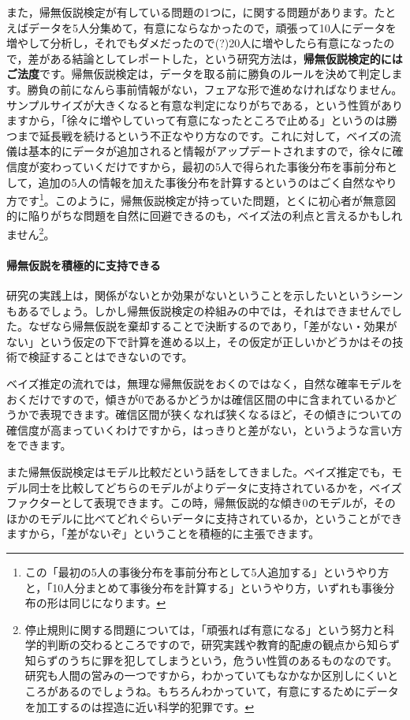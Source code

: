 \documentclass{ltjbook}
\begin{document}
また，帰無仮説検定が有している問題の1つに，に関する問題があります。たとえばデータを5人分集めて，有意にならなかったので，頑張って10人にデータを増やして分析し，それでもダメだったので(?)20人に増やしたら有意になったので，差がある結論としてレポートした，という研究方法は，\textbf{帰無仮説検定的にはご法度}です。帰無仮説検定は，データを取る前に勝負のルールを決めて判定します。勝負の前になんら事前情報がない，フェアな形で進めなければなりません。サンプルサイズが大きくなると有意な判定になりがちである，という性質がありますから，「徐々に増やしていって有意になったところで止める」というのは勝つまで延長戦を続けるという不正なやり方なのです。これに対して，ベイズの流儀は基本的にデータが追加されると情報がアップデートされますので，徐々に確信度が変わっていくだけですから，最初の5人で得られた事後分布を事前分布として，追加の5人の情報を加えた事後分布を計算するというのはごく自然なやり方です\footnote{この「最初の5人の事後分布を事前分布として5人追加する」というやり方と，「10人分まとめて事後分布を計算する」というやり方，いずれも事後分布の形は同じになります。}。このように，帰無仮説検定が持っていた問題，とくに初心者が無意図的に陥りがちな問題を自然に回避できるのも，ベイズ法の利点と言えるかもしれません\footnote{停止規則に関する問題については，「頑張れば有意になる」という努力と科学的判断の交わるところですので，研究実践や教育的配慮の観点から知らず知らずのうちに罪を犯してしまうという，危うい性質のあるものなのです。研究も人間の営みの一つですから，わかっていてもなかなか区別しにくいところがあるのでしょうね。もちろんわかっていて，有意にするためにデータを加工するのは捏造に近い科学的犯罪です。}。

\paragraph{帰無仮説を積極的に支持できる}
研究の実践上は，関係がないとか効果がないということを示したいというシーンもあるでしょう。しかし帰無仮説検定の枠組みの中では，それはできませんでした。なぜなら帰無仮説を棄却することで決断するのであり，「差がない・効果がない」という仮定の下で計算を進める以上，その仮定が正しいかどうかはその技術で検証することはできないのです。

ベイズ推定の流れでは，無理な帰無仮説をおくのではなく，自然な確率モデルをおくだけですので，傾きが0であるかどうかは確信区間の中に含まれているかどうかで表現できます。確信区間が狭くなれば狭くなるほど，その傾きについての確信度が高まっていくわけですから，はっきりと差がない，というような言い方をできます。

また帰無仮説検定はモデル比較だという話をしてきました。ベイズ推定でも，モデル同士を比較してどちらのモデルがよりデータに支持されているかを，ベイズファクターとして表現できます。この時，帰無仮説的な傾き0のモデルが，そのほかのモデルに比べてどれぐらいデータに支持されているか，ということができますから，「差がないぞ」ということを積極的に主張できます。
\end{document}
